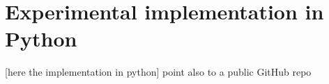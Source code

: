 \chapter{Experimental implementation in Python}
\label{chap:pyImpl}

[here the implementation in python]
point also to a public GitHub repo

